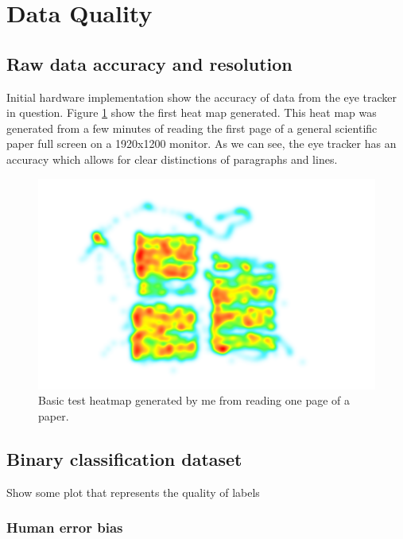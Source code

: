 \section{Data Quality} \label{sec:res_DataQuality}

\subsection{Raw data accuracy and resolution}

Initial hardware implementation show the accuracy of data from the eye tracker in question. Figure \ref{fig:res_FirstHeatMapTest} show the first heat map generated. This heat map was generated from a few minutes of reading the first page of a general scientific paper full screen on a 1920x1200 monitor. As we can see, the eye tracker has an accuracy which allows for clear distinctions of paragraphs and lines.

\begin{figure}[h]
    \centering
    \includegraphics[width=\textwidth]{Images/Heatmaps/firstHeatmapTest.png}
    \caption{Basic test heatmap generated by me from reading one page of a paper.}
    \label{fig:res_FirstHeatMapTest}
\end{figure}

\subsection{Binary classification dataset}

Show some plot that represents the quality of labels

\subsubsection{Human error bias}

